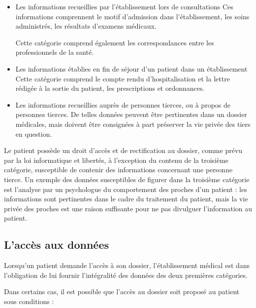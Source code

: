 \begin{itemize}

\item Les informations recueillies par l'établissement lors de consultations \newline{}
Ces informations comprennent le motif d'admission dans l'établissement, les soins administrés, 
les résultats d'examens médicaux.

Cette catégorie comprend également les correspondances entre les professionnels de la santé.

\item Les informations établies en fin de séjour d'un patient dans un établissement \newline{}
Cette catégorie comprend le compte rendu d'hospitalisation et la lettre rédigée à la sortie
du patient, les prescriptions et ordonnances.

\item Les informations recueillies auprès de personnes tierces, ou à propos de personnes tierces. \newline{}
De telles données peuvent être pertinentes dans un dossier médicales, mais doivent être
consignées à part préserver la vie privée des tiers en question.

\end{itemize}

Le patient possède un droit d'accès et de rectification au dossier, comme prévu par la loi
informatique et libertés, à l'exception du contenu de la troisième catégorie, susceptible de 
contenir des informations concernant une personne tierce. Un exemple des données 
susceptibles de figurer dans la troisième catégorie est l'analyse par un psychologue du
comportement des proches d'un patient : les informations sont pertinentes dans le
cadre du traitement du patient, mais la vie privée des proches est une raison suffisante
pour ne pas divulguer l'information au patient.

\subsection{L'accès aux données}

Lorsqu'un patient demande l'accès à son dossier, l'établissement médical est dans l'obligation
de lui fournir l'intégralité des données des deux premières catégories. 

Dans certains cas, il est possible que l'accès au dossier soit proposé au patient sous conditions :

